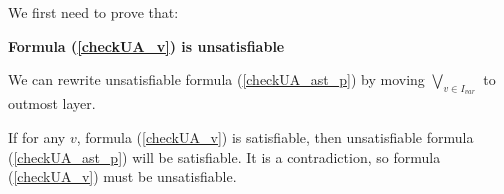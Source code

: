 \documentclass[journal]{IEEEtran}
\begin{document}
We first need to prove that:
\vspace{0.2cm}
\begin{theorem}[]\label{thm_checkUA_v}
\textbf{Formula (\ref{checkUA_v}) is unsatisfiable}
\end{theorem}
\begin{IEEEproof}
%
We can rewrite unsatisfiable formula (\ref{checkUA_ast_p}) by moving $\bigvee_{v\in I_{var}}$ to outmost layer.
\begin{displaymath}\label{checkUA_rew}
\end{displaymath}

If for any $v$,
formula (\ref{checkUA_v}) is satisfiable,
then unsatisfiable formula (\ref{checkUA_ast_p}) will be satisfiable.
It is a contradiction,
so formula (\ref{checkUA_v}) must be unsatisfiable.
\end{IEEEproof}
\end{document}
